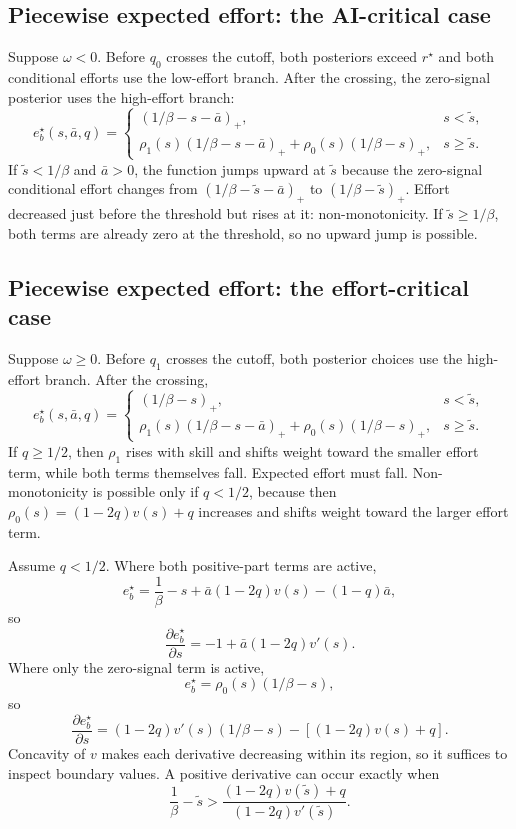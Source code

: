\documentclass[11pt]{article}
\theoremstyle{tutorial}
\theoremstyle{remark}
\newcommand{\1}{\mathbb{I}}
\newcommand{\pos}[1]{\left(#1\right)_{+}}
\begin{document}
\subsection{Piecewise expected effort: the AI-critical case}

Suppose $\omega<0$.  Before $q_0$ crosses the cutoff, both posteriors exceed $r^\star$ and both conditional
efforts use the low-effort branch.  After the crossing, the zero-signal posterior uses the high-effort branch:
\[
e_b^\star(s,\bar a,q)=
\begin{cases}
\pos{1/\beta-s-\bar a},&s<\tilde s,\\
\rho_1(s)\pos{1/\beta-s-\bar a}
+\rho_0(s)\pos{1/\beta-s},&s\ge\tilde s.
\end{cases}
\]
If $\tilde s<1/\beta$ and $\bar a>0$, the function jumps upward at $\tilde s$ because the zero-signal
conditional effort changes from $\pos{1/\beta-\tilde s-\bar a}$ to
$\pos{1/\beta-\tilde s}$.  Effort decreased just before the threshold but rises at it: non-monotonicity.
If $\tilde s\ge1/\beta$, both terms are already zero at the threshold, so no upward jump is possible.

\subsection{Piecewise expected effort: the effort-critical case}

Suppose $\omega\ge0$.  Before $q_1$ crosses the cutoff, both posterior choices use the high-effort branch.
After the crossing,
\[
e_b^\star(s,\bar a,q)=
\begin{cases}
\pos{1/\beta-s},&s<\tilde s,\\
\rho_1(s)\pos{1/\beta-s-\bar a}
+\rho_0(s)\pos{1/\beta-s},&s\ge\tilde s.
\end{cases}
\]
If $q\ge1/2$, then $\rho_1$ rises with skill and shifts weight toward the smaller effort term, while both
terms themselves fall.  Expected effort must fall.  Non-monotonicity is possible only if $q<1/2$, because
then $\rho_0(s)=(1-2q)v(s)+q$ increases and shifts weight toward the larger effort term.

Assume $q<1/2$.  Where both positive-part terms are active,
\[
e_b^\star=\frac1\beta-s+\bar a(1-2q)v(s)-(1-q)\bar a,
\]
so
\[
\frac{\partial e_b^\star}{\partial s}=-1+\bar a(1-2q)v'(s).
\]
Where only the zero-signal term is active,
\[
e_b^\star=\rho_0(s)(1/\beta-s),
\]
so
\[
\frac{\partial e_b^\star}{\partial s}
=(1-2q)v'(s)(1/\beta-s)-[(1-2q)v(s)+q].
\]
Concavity of $v$ makes each derivative decreasing within its region, so it suffices to inspect boundary
values.  A positive derivative can occur exactly when
\[
\frac1\beta-\tilde s>
\frac{(1-2q)v(\tilde s)+q}{(1-2q)v'(\tilde s)}.
\]
\end{document}
